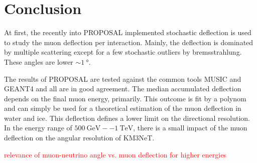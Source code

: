 \section{Conclusion}\label{sec:conclusion}

At first, the recently into PROPOSAL implemented stochastic deflection is 
used to study the muon deflection per interaction. Mainly, the deflection 
is dominated by multiple scattering except for a few stochastic 
outliers by bremsstrahlung. These angles are lower $\sim\SI{1}{\degree}$. 

The results of PROPOSAL are tested against the common tools MUSIC and 
GEANT4 and all are in good agreement.
The median accumulated deflection depends on the final muon energy, primarily. 
This outcome is fit by a polynom and can simply be used for 
a theoretical estimation of the muon deflection in water and ice.
This deflection defines a lower limit on the directional resolution.
In the energy range of $\SI{500}{\giga\electronvolt} -- \SI{1}{\tera\electronvolt}$, there is a small impact of the muon deflection on the angular 
resolution of KM3NeT.

\textcolor{red}{relevance of muon-neutrino angle vs. muon deflection for higher energies}
